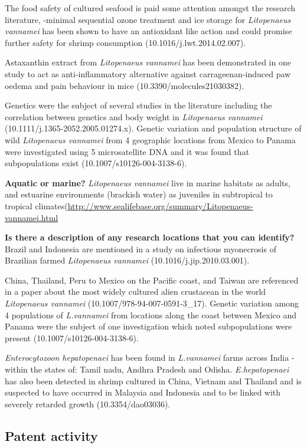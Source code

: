 \documentclass[]{book}
\theoremstyle{definition}
\theoremstyle{definition}
\theoremstyle{definition}
\theoremstyle{remark}
\begin{document}
The food safety of cultured seafood is paid some attention amongst the
research literature, -minimal sequential ozone treatment and ice storage
for \emph{Litopenaeus vannamei} has been shown to have an antioxidant
like action and could promise further safety for shrimp consumption
(10.1016/j.lwt.2014.02.007).

Astaxanthin extract from \emph{Litopenaeus vannamei} has been
demonstrated in one study to act as anti-inflammatory alternative
against carrageenan-induced paw oedema and pain behaviour in mice
(10.3390/molecules21030382).

Genetics were the subject of several studies in the literature including
the correlation between genetics and body weight in \emph{Litopenaeus
vannamei} (10.1111/j.1365-2052.2005.01274.x). Genetic variation and
population structure of wild \emph{Litopenaeus vannamei} from 4
geographic locations from Mexico to Panama were investigated using 5
microsatellite DNA and it was found that subpopulations exist
(10.1007/s10126-004-3138-6).

\textbf{Aquatic or marine?} \emph{Litopenaeus vannamei} live in marine
habitats as adults, and estuarine environments (brackish water) as
juveniles in subtropical to tropical
climates(\url{http://www.sealifebase.org/summary/Litopenaeus-vannamei.html}

\textbf{Is there a description of any research locations that you can
identify?}\\
Brazil and Indonesia are mentioned in a study on infectious myonecrosis
of Brazilian farmed \emph{Litopenaeus vannamei}
(10.1016/j.jip.2010.03.001).

China, Thailand, Peru to Mexico on the Pacific coast, and Taiwan are
referenced in a paper about the most widely cultured alien crustacean in
the world \emph{Litopenaeus vannamei} (10.1007/978-94-007-0591-3\_17).
Genetic variation among 4 populations of \emph{L.vannamei} from
locations along the coast between Mexico and Panama were the subject of
one investigation which noted subpopulations were present
(10.1007/s10126-004-3138-6).

\emph{Enterocytozoon hepatopenaei} has been found in \emph{L.vannamei}
farms across India - within the states of: Tamil nadu, Andhra Pradesh
and Odisha. \emph{E.hepatopenaei} has also been detected in shrimp
cultured in China, Vietnam and Thailand and is suspected to have
occurred in Malaysia and Indonesia and to be linked with severely
retarded growth (10.3354/dao03036).

\hypertarget{patent-activity-2}{%
\subsection{Patent activity}\label{patent-activity-2}}
\end{document}
